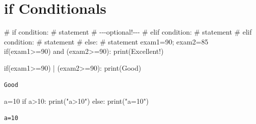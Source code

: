\documentclass[
  a4paper,
  DIV=11,
  numbers=noendperiod]{scrreprt}
\newenvironment{Shaded}{\begin{snugshade}}{\end{snugshade}}
\newcommand{\BuiltInTok}[1]{\textcolor[rgb]{0.00,0.23,0.31}{#1}}
\newcommand{\CommentTok}[1]{\textcolor[rgb]{0.37,0.37,0.37}{#1}}
\newcommand{\ControlFlowTok}[1]{\textcolor[rgb]{0.00,0.23,0.31}{#1}}
\newcommand{\DecValTok}[1]{\textcolor[rgb]{0.68,0.00,0.00}{#1}}
\newcommand{\KeywordTok}[1]{\textcolor[rgb]{0.00,0.23,0.31}{#1}}
\newcommand{\NormalTok}[1]{\textcolor[rgb]{0.00,0.23,0.31}{#1}}
\newcommand{\OperatorTok}[1]{\textcolor[rgb]{0.37,0.37,0.37}{#1}}
\newcommand{\StringTok}[1]{\textcolor[rgb]{0.13,0.47,0.30}{#1}}
\begin{document}
\section{if Conditionals}\label{if-conditionals}

\begin{Shaded}
\begin{Highlighting}[]
\CommentTok{\# if condition:}
\CommentTok{\#    statement}
\CommentTok{\# {-}{-}{-}optional!{-}{-}{-}}
\CommentTok{\# elif condition:}
\CommentTok{\#     statement}
\CommentTok{\# elif condition:}
\CommentTok{\#     statement}
\CommentTok{\# else:}
\CommentTok{\#     statement}
\NormalTok{exam1}\OperatorTok{=}\DecValTok{90}\OperatorTok{;}\NormalTok{ exam2}\OperatorTok{=}\DecValTok{85}
\ControlFlowTok{if}\NormalTok{(exam1}\OperatorTok{\textgreater{}=}\DecValTok{90}\NormalTok{) }\KeywordTok{and}\NormalTok{ (exam2}\OperatorTok{\textgreater{}=}\DecValTok{90}\NormalTok{):}
    \BuiltInTok{print}\NormalTok{(}\StringTok{\textquotesingle{}Excellent!\textquotesingle{}}\NormalTok{)}
\end{Highlighting}
\end{Shaded}

\begin{Shaded}
\begin{Highlighting}[]
\ControlFlowTok{if}\NormalTok{(exam1}\OperatorTok{\textgreater{}=}\DecValTok{90}\NormalTok{) }\OperatorTok{|}\NormalTok{ (exam2}\OperatorTok{\textgreater{}=}\DecValTok{90}\NormalTok{):}
    \BuiltInTok{print}\NormalTok{(}\StringTok{\textquotesingle{}Good\textquotesingle{}}\NormalTok{)}
\end{Highlighting}
\end{Shaded}

\begin{verbatim}
Good
\end{verbatim}

\begin{Shaded}
\begin{Highlighting}[]
\NormalTok{a}\OperatorTok{=}\DecValTok{10}
\ControlFlowTok{if}\NormalTok{ a}\OperatorTok{\textgreater{}}\DecValTok{10}\NormalTok{:}
    \BuiltInTok{print}\NormalTok{(}\StringTok{"a\textgreater{}10"}\NormalTok{)}
\ControlFlowTok{else}\NormalTok{:}
    \BuiltInTok{print}\NormalTok{(}\StringTok{"a=10"}\NormalTok{)}
\end{Highlighting}
\end{Shaded}

\begin{verbatim}
a=10
\end{verbatim}
\end{document}
